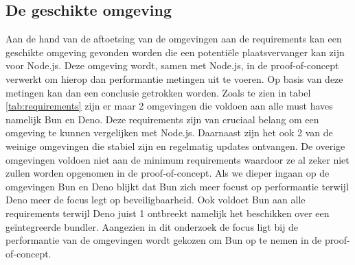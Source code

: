\subsection{De geschikte omgeving}
Aan de hand van de aftoetsing van de omgevingen aan de requirements kan een geschikte 
omgeving gevonden worden die een potentiële plaatsvervanger kan zijn voor Node.js.
Deze omgeving wordt, samen met Node.js, in de proof-of-concept verwerkt om hierop dan performantie metingen uit te voeren.
Op basis van deze metingen kan dan een conclusie getrokken worden.
Zoals te zien in tabel \ref{tab:requirements} zijn er maar 2 omgevingen die voldoen aan alle must haves namelijk Bun en Deno. 
Deze requirements zijn van cruciaal belang om een omgeving te kunnen vergelijken met Node.js. 
Daarnaast zijn het ook 2 van de weinige omgevingen die stabiel zijn en regelmatig updates ontvangen. 
De overige omgevingen voldoen niet aan de minimum requirements waardoor ze al zeker niet zullen worden opgenomen in de proof-of-concept.
Als we dieper ingaan op de omgevingen Bun en Deno blijkt dat Bun zich meer focust op performantie terwijl Deno meer de focus legt op beveiligbaarheid.
Ook voldoet Bun aan alle requirements terwijl Deno juist 1 ontbreekt namelijk het beschikken over een geïntegreerde bundler. 
Aangezien in dit onderzoek de focus ligt bij de performantie van de omgevingen wordt gekozen om Bun op te nemen in de proof-of-concept.